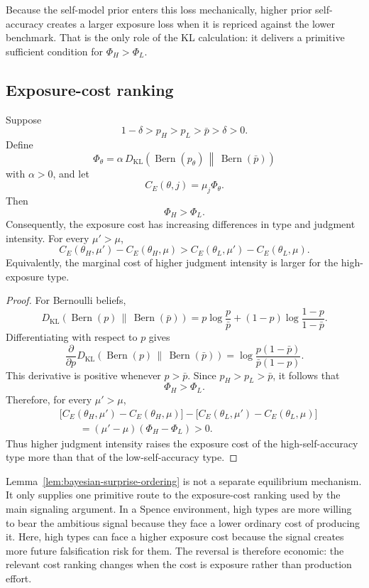 Because the self-model prior enters this loss mechanically, higher prior self-accuracy creates a larger exposure loss when it is repriced against the lower benchmark. That is the only role of the KL calculation: it delivers a primitive sufficient condition for \(\Phi_H>\Phi_L\).

\subsection{Exposure-cost ranking}

\begin{lemma}
\label{lem:bayesian-surprise-ordering}
Suppose
\[
1-\delta>p_H>p_L>\bar p>\delta>0.
\]
Define
\[
\Phi_\theta
=
\alpha\,
D_{\mathrm{KL}}
\left(
\operatorname{Bern}(p_\theta)
\,\middle\|\,
\operatorname{Bern}(\bar p)
\right)
\]
with $\alpha>0$, and let
\[
C_E(\theta,j)=\mu_j\Phi_\theta.
\]
Then
\[
\Phi_H>\Phi_L.
\]
Consequently, the exposure cost has increasing differences in type and judgment intensity. For every $\mu'>\mu$,
\[
C_E(\theta_H,\mu')-C_E(\theta_H,\mu)
>
C_E(\theta_L,\mu')-C_E(\theta_L,\mu).
\]
Equivalently, the marginal cost of higher judgment intensity is larger for the high-exposure type.
\end{lemma}

\begin{proof}
For Bernoulli beliefs,
\[
D_{\mathrm{KL}}
\left(
\operatorname{Bern}(p)
\,\middle\|\,
\operatorname{Bern}(\bar p)
\right)
=
p\log\frac{p}{\bar p}
+
(1-p)\log\frac{1-p}{1-\bar p}.
\]
Differentiating with respect to $p$ gives
\[
\frac{\partial}{\partial p}
D_{\mathrm{KL}}
\left(
\operatorname{Bern}(p)
\,\middle\|\,
\operatorname{Bern}(\bar p)
\right)
=
\log\frac{p(1-\bar p)}{\bar p(1-p)}.
\]
This derivative is positive whenever $p>\bar p$. Since $p_H>p_L>\bar p$, it follows that
\[
\Phi_H>\Phi_L.
\]
Therefore, for every $\mu'>\mu$,
\[
\begin{aligned}
&\big[C_E(\theta_H,\mu')-C_E(\theta_H,\mu)\big]
-\big[C_E(\theta_L,\mu')-C_E(\theta_L,\mu)\big]\\
&\qquad
=(\mu'-\mu)(\Phi_H-\Phi_L)>0.
\end{aligned}
\]
Thus higher judgment intensity raises the exposure cost of the high-self-accuracy type more than that of the low-self-accuracy type.
\end{proof}

Lemma~\ref{lem:bayesian-surprise-ordering} is not a separate equilibrium mechanism. It only supplies one primitive route to the exposure-cost ranking used by the main signaling argument. In a Spence environment, high types are more willing to bear the ambitious signal because they face a lower ordinary cost of producing it. Here, high types can face a higher exposure cost because the signal creates more future falsification risk for them. The reversal is therefore economic: the relevant cost ranking changes when the cost is exposure rather than production effort.

